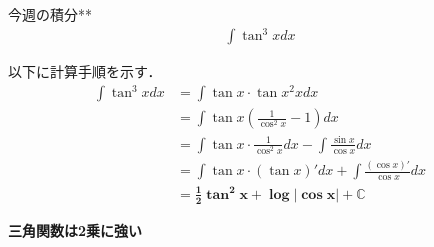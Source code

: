 \documentclass[main]{subfiles}
\begin{document}

\begin{mondai}{1}{今週の積分}{**}
    \begin{align*}
        \int \tan^3 x dx
    \end{align*}
\end{mondai}


\solutionhead
\hfill
以下に計算手順を示す．
\hfill\ 
\begin{align*}
    \int \tan ^3 x dx   
        &= \int \tan x \cdot \tan x ^2 x dx \\
        &= \int \tan x \left( \frac{1}{\cos ^2 x} -1 \right)  dx \\
        &= \int \tan x \cdot \frac{1}{\cos ^2 x} dx - \int \frac{\sin x}{\cos x} dx \\
        &= \int \tan x \cdot \left(\tan x\right)' dx + \int \frac{\left(\cos x\right)'}{\cos x} dx \\
        &= \boldsymbol{\frac{1}{2} \tan ^2 x + \log \left| \cos x \right| + \mathbb{C}}
\end{align*}

\begin{focusbox}
\centering
\textbf{三角関数は2乗に強い}
\end{focusbox}
\end{document}

